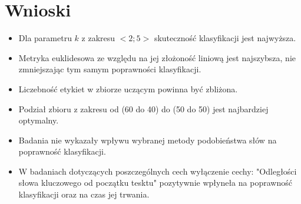 \documentclass{classrep}
\begin{document}
\section{Wnioski}




\begin{itemize}
    \item Dla parametru $k$ z zakresu $<2;5>$ skuteczność klasyfikacji jest najwyższa.
    \item Metryka euklidesowa ze względu na jej złożoność liniową jest najszybsza, nie zmniejszając
            tym samym poprawności klasyfikacji.
    \item Liczebność etykiet w zbiorze uczącym powinna być zbliżona.
    \item Podział zbioru z zakresu od (60 do 40) do (50 do 50) jest najbardziej optymalny.
    \item Badania nie wykazały wpływu wybranej metody podobieństwa słów na poprawność klasyfikacji.
    \item W badaniach dotyczących poszczególnych cech wyłączenie cechy: "Odległości słowa kluczowego
        od początku tesktu" pozytywnie wpłyneła na poprawność klasyfikacji oraz na czas jej trwania.
\end{itemize}
\end{document}
